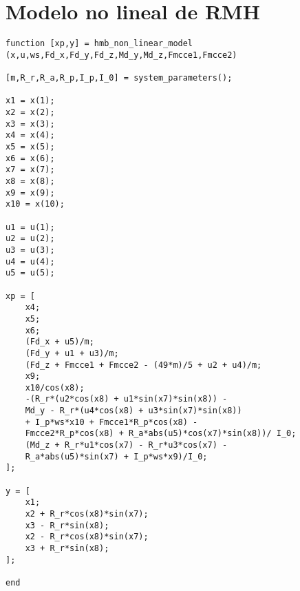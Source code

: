 \chapter{Modelo no lineal de RMH}

\begin{lstlisting}[frame=single]
function [xp,y] = hmb_non_linear_model
(x,u,ws,Fd_x,Fd_y,Fd_z,Md_y,Md_z,Fmcce1,Fmcce2)

[m,R_r,R_a,R_p,I_p,I_0] = system_parameters();

x1 = x(1);
x2 = x(2);
x3 = x(3);
x4 = x(4);
x5 = x(5);
x6 = x(6);
x7 = x(7);
x8 = x(8);
x9 = x(9);
x10 = x(10);

u1 = u(1);
u2 = u(2);
u3 = u(3);
u4 = u(4);
u5 = u(5);

xp = [
	x4;
	x5;
	x6;
	(Fd_x + u5)/m;
	(Fd_y + u1 + u3)/m;
	(Fd_z + Fmcce1 + Fmcce2 - (49*m)/5 + u2 + u4)/m;
	x9;
	x10/cos(x8);
	-(R_r*(u2*cos(x8) + u1*sin(x7)*sin(x8)) - 
	Md_y - R_r*(u4*cos(x8) + u3*sin(x7)*sin(x8))   	
	+ I_p*ws*x10 + Fmcce1*R_p*cos(x8) - 
	Fmcce2*R_p*cos(x8) + R_a*abs(u5)*cos(x7)*sin(x8))/ I_0;
	(Md_z + R_r*u1*cos(x7) - R_r*u3*cos(x7) - 
	R_a*abs(u5)*sin(x7) + I_p*ws*x9)/I_0;
];

y = [
	x1;
	x2 + R_r*cos(x8)*sin(x7);
	x3 - R_r*sin(x8);
	x2 - R_r*cos(x8)*sin(x7);
	x3 + R_r*sin(x8);
];

end

\end{lstlisting}
 
